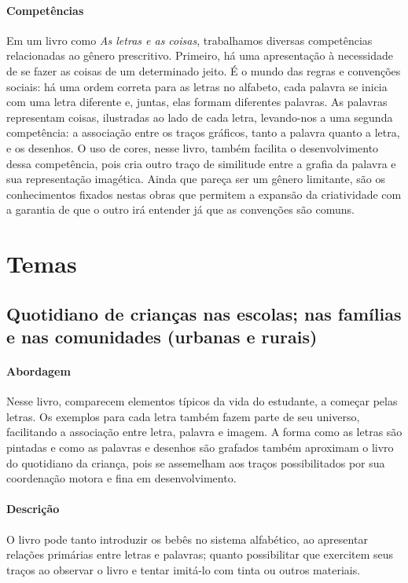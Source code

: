 \documentclass[11pt]{extarticle}
\begin{document}
\paragraph{Competências} Em um livro como
\emph{As letras e as coisas}, trabalhamos diversas competências relacionadas ao gênero prescritivo. 
Primeiro, há uma apresentação à necessidade de se fazer as coisas de um 
determinado jeito. É o mundo das regras e convenções sociais: há uma ordem correta para as letras no alfabeto, cada palavra se inicia com uma letra diferente e, juntas, elas formam diferentes palavras. As palavras representam coisas, ilustradas ao lado de cada letra, levando-nos a uma segunda competência: a associação entre os traços gráficos, tanto a palavra quanto a letra, e os desenhos. O uso de cores, nesse livro, também facilita o desenvolvimento dessa competência, pois cria outro traço de similitude entre a grafia da palavra e sua representação imagética. Ainda que pareça ser um gênero
limitante, são os conhecimentos fixados nestas obras que permitem a expansão
da criatividade com a garantia de que o outro irá entender já que as convenções são comuns.



\section{Temas}


\subsection{Quotidiano de crianças nas escolas; nas famílias e nas comunidades (urbanas e rurais)}

\paragraph{Abordagem} Nesse livro, comparecem elementos típicos da vida do estudante, a começar pelas letras. Os exemplos para cada letra também fazem parte de seu universo, facilitando a associação entre letra, palavra e imagem. A forma como as letras são pintadas e como as palavras e desenhos são grafados também aproximam o livro do quotidiano da criança, pois se assemelham aos traços possibilitados por sua coordenação motora e fina em desenvolvimento.

\paragraph{Descrição} O livro pode tanto introduzir os bebês no sistema alfabético, ao apresentar relações primárias entre letras e palavras; quanto possibilitar que exercitem seus traços ao observar o livro e tentar imitá-lo com tinta ou outros materiais.
\end{document}
